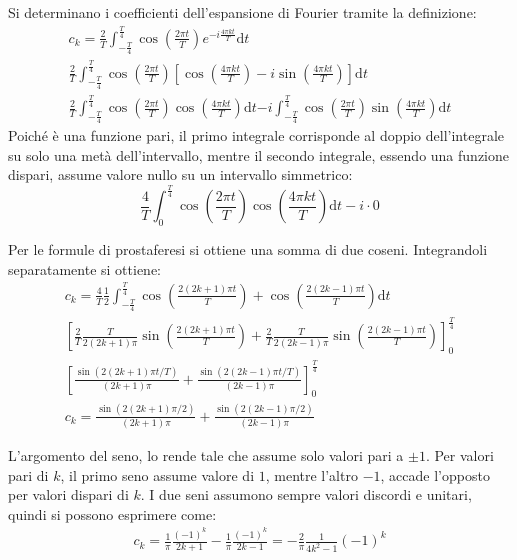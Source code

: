 \documentclass{article}
\newcommand{\df}{\mathrm{d}}
\begin{document}
Si determinano i coefficienti dell'espansione di Fourier tramite la definizione:
\begin{gather*}
    c_k=\displaystyle\frac{2}{T}\int_{-\frac{T}{4}}^{\frac{T}{4}}\cos\left(\displaystyle\frac{2\pi t}{T}\right)e^{-i\frac{4\pi kt}{T}}\df t\\
    \displaystyle\frac{2}{T}\int_{-\frac{T}{4}}^{\frac{T}{4}}\cos\left(\displaystyle\frac{2\pi t}{T}\right)\left[\cos\left(\frac{4\pi kt}{T}\right)-i\sin\left(\frac{4\pi kt}{T}\right)\right]\df t\\
    \displaystyle\frac{2}{T}\int_{-\frac{T}{4}}^{\frac{T}{4}}\cos\left(\frac{2\pi t}{T}\right)\cos\left(\frac{4\pi kt}{T}\right)\df t
    {-i\int_{-\frac{T}{4}}^{\frac{T}{4}}\cos\left(\frac{2\pi t}{T}\right)\sin\left(\frac{4\pi kt}{T}\right)\df t}
\end{gather*}
Poiché è una funzione pari, il primo integrale corrisponde al doppio dell'integrale su solo una metà dell'intervallo, mentre il secondo integrale, essendo una funzione 
dispari, assume valore nullo su un intervallo simmetrico:
\begin{equation*}
    \displaystyle\frac{4}{T}\int_{0}^{\frac{T}{4}}\cos\left(\frac{2\pi t}{T}\right)\cos\left(\frac{4\pi kt}{T}\right)\df t-i\cdot0
\end{equation*}


Per le formule di prostaferesi si ottiene una somma di due coseni. Integrandoli separatamente si ottiene:
\begin{gather*}
    c_k=\displaystyle\frac{4}{T}\frac{1}{2}\int_{-\frac{T}{4}}^{\frac{T}{4}}\cos\left(\frac{2(2k+1)\pi t}{T}\right)+\cos\left(\frac{2(2k-1)\pi t}{T}\right)\df t\\
    \displaystyle\left[\frac{2}{T}\frac{T}{2(2k+1)\pi}\sin\left(\frac{2(2k+1)\pi t}{T}\right)+
    \frac{2}{T}\frac{T}{2(2k-1)\pi}\sin\left(\frac{2(2k-1)\pi t}{T}\right)\right]_{0}^{\frac{T}{4}}\\
    \left[\displaystyle\frac{\sin(2(2k+1)\pi t/T)}{(2k+1)\pi}+\frac{\sin(2(2k-1)\pi t/T)}{(2k-1)\pi}\right]_0^{\frac{T}{4}}\\
    c_k=\displaystyle\frac{\sin(2(2k+1)\pi/2)}{(2k+1)\pi}+\frac{\sin(2(2k-1)\pi/2)}{(2k-1)\pi}
\end{gather*}

L'argomento del seno, lo rende tale che assume solo valori pari a $\pm1$. Per valori pari di $k$, il primo seno assume valore di $1$, mentre l'altro $-1$, accade l'opposto per 
valori dispari di $k$. 
I due seni assumono sempre valori discordi e unitari, quindi si possono esprimere come: 
\begin{gather}
    c_k=\displaystyle\frac{1}{\pi}\frac{(-1)^k}{2k+1}-\frac{1}{\pi}\frac{(-1)^k}{2k-1}=-\frac{2}{\pi}\frac{1}{4k^2-1}(-1)^k
\end{gather}
\end{document}
